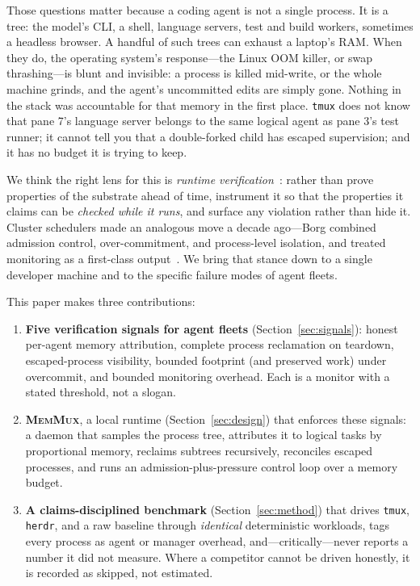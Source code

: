 \documentclass[11pt]{article}
\newcommand{\sys}{\textsc{MemMux}}
\newcommand{\code}[1]{\texttt{#1}}
\begin{document}
Those questions matter because a coding agent is not a single process. It is a tree: the model's
CLI, a shell, language servers, test and build workers, sometimes a headless browser. A handful of
such trees can exhaust a laptop's RAM. When they do, the operating system's response---the Linux OOM
killer, or swap thrashing---is blunt and invisible: a process is killed mid-write, or the whole
machine grinds, and the agent's uncommitted edits are simply gone. Nothing in the stack was
accountable for that memory in the first place. \code{tmux} does not know that pane 7's language
server belongs to the same logical agent as pane 3's test runner; it cannot tell you that a
double-forked child has escaped supervision; and it has no budget it is trying to keep.

We think the right lens for this is \emph{runtime verification}~\citep{bartocci2018introrv}: rather
than prove properties of the substrate ahead of time, instrument it so that the properties it claims
can be \emph{checked while it runs}, and surface any violation rather than hide it. Cluster
schedulers made an analogous move a decade ago---Borg combined admission control, over-commitment,
and process-level isolation, and treated monitoring as a first-class output~\citep{verma2015borg}.
We bring that stance down to a single developer machine and to the specific failure modes of agent
fleets.

This paper makes three contributions:
\begin{enumerate}[leftmargin=1.4em,itemsep=2pt,topsep=2pt]
  \item \textbf{Five verification signals for agent fleets} (Section~\ref{sec:signals}): honest
  per-agent memory attribution, complete process reclamation on teardown, escaped-process
  visibility, bounded footprint (and preserved work) under overcommit, and bounded monitoring
  overhead. Each is a monitor with a stated threshold, not a slogan.
  \item \textbf{\sys{}}, a local runtime (Section~\ref{sec:design}) that enforces these signals: a
  daemon that samples the process tree, attributes it to logical tasks by proportional memory,
  reclaims subtrees recursively, reconciles escaped processes, and runs an admission-plus-pressure
  control loop over a memory budget.
  \item \textbf{A claims-disciplined benchmark} (Section~\ref{sec:method}) that drives \code{tmux},
  \code{herdr}, and a raw baseline through \emph{identical} deterministic workloads, tags every
  process as agent or manager overhead, and---critically---never reports a number it did not
  measure. Where a competitor cannot be driven honestly, it is recorded as skipped, not estimated.
\end{enumerate}
\end{document}
